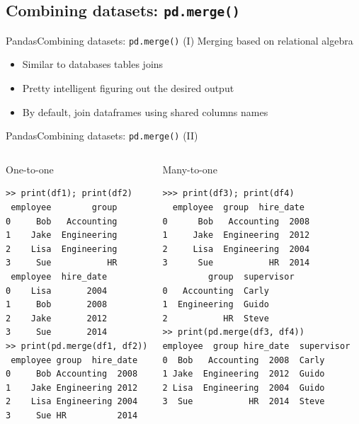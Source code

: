 \documentclass[10pt,compress]{beamer} %
\begin{document}
\subsection{Combining datasets: \texttt{pd.merge()}}

\begin{frame}[fragile]{Pandas}{Combining datasets: \texttt{pd.merge()} (I)}
	Merging based on relational algebra
	\begin{itemize}
		\item Similar to databases tables joins
		\item Pretty intelligent figuring out the desired output
		\item By default, join dataframes using shared columns names
	\end{itemize}
\end{frame}

\begin{frame}[fragile]{Pandas}{Combining datasets: \texttt{pd.merge()} (II)}
	\scriptsize{
	\begin{columns}
		\begin{exampleblock}{One-to-one}
		\vspace{-0.2cm} 
		\begin{lstlisting}
>> print(df1); print(df2)
 employee        group
0     Bob   Accounting
1    Jake  Engineering
2    Lisa  Engineering
3     Sue           HR
 employee  hire_date
0    Lisa       2004
1     Bob       2008
2    Jake       2012
3     Sue       2014
>> print(pd.merge(df1, df2))
 employee group  hire_date
0     Bob Accounting  2008
1    Jake Engineering 2012
2    Lisa Engineering 2004
3     Sue HR          2014
		\end{lstlisting}
		\vspace{-0.2cm} 
		\end{exampleblock}

		\begin{exampleblock}{Many-to-one}
		\vspace{-0.2cm} 
		\begin{lstlisting}
>>> print(df3); print(df4)
  employee  group  hire_date
0      Bob   Accounting  2008
1     Jake  Engineering  2012
2     Lisa  Engineering  2004
3      Sue           HR  2014
         group  supervisor
0   Accounting  Carly
1  Engineering  Guido
2           HR  Steve
>> print(pd.merge(df3, df4))
employee  group hire_date  supervisor
0  Bob   Accounting  2008  Carly
1 Jake  Engineering  2012  Guido
2 Lisa  Engineering  2004  Guido
3  Sue           HR  2014  Steve
		\end{lstlisting}
		\vspace{-0.2cm} 
		\end{exampleblock}
	\end{columns}
	}
\end{frame}
\end{document}
